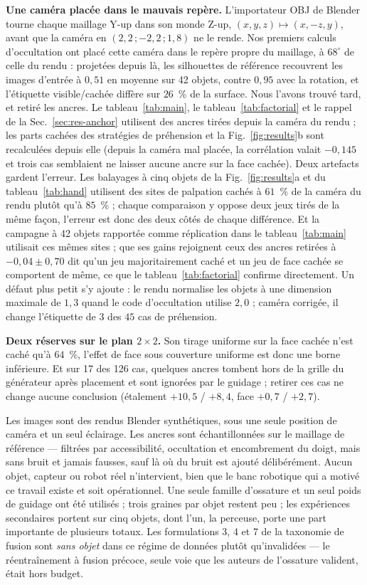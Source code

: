 \documentclass[conference]{IEEEtran}
\begin{document}
\textbf{Une caméra placée dans le mauvais repère.} L'importateur OBJ de Blender tourne
chaque maillage Y-up dans son monde Z-up, $(x, y, z) \mapsto (x, -z, y)$, avant que la
caméra en $(2{,}2\,; -2{,}2\,; 1{,}8)$ ne le rende. Nos premiers calculs d'occultation
ont placé cette caméra dans le repère propre du maillage, à $68^\circ$ de celle du
rendu : projetées depuis là, les silhouettes de référence recouvrent les images
d'entrée à $0{,}51$ en moyenne sur 42 objets, contre $0{,}95$ avec la rotation, et
l'étiquette visible/cachée diffère sur $26$~\% de la surface. Nous l'avons trouvé tard,
et retiré les ancres. Le tableau~\ref{tab:main}, le tableau~\ref{tab:factorial} et le
rappel de la Sec.~\ref{sec:res-anchor} utilisent des ancres tirées depuis la caméra du
rendu ; les parts cachées des stratégies de préhension et la Fig.~\ref{fig:results}b
sont recalculées depuis elle (depuis la caméra mal placée, la corrélation valait
$-0{,}145$ et trois cas semblaient ne laisser aucune ancre sur la face cachée). Deux
artefacts gardent l'erreur. Les balayages à cinq objets de la Fig.~\ref{fig:results}a
et du tableau~\ref{tab:hand} utilisent des sites de palpation cachés à $61$~\% de la
caméra du rendu plutôt qu'à $85$~\% ; chaque comparaison y oppose deux jeux tirés de la
même façon, l'erreur est donc des deux côtés de chaque différence. Et la campagne à 42
objets rapportée comme réplication dans le tableau~\ref{tab:main} utilisait ces mêmes
sites ; que ses gains rejoignent ceux des ancres retirées à $-0{,}04 \pm 0{,}70$ dit
qu'un jeu majoritairement caché et un jeu de face cachée se comportent de même, ce que
le tableau~\ref{tab:factorial} confirme directement. Un défaut plus petit s'y ajoute :
le rendu normalise les objets à une dimension maximale de $1{,}3$ quand le code
d'occultation utilise $2{,}0$ ; caméra corrigée, il change l'étiquette de $3$ des $45$
cas de préhension.

\textbf{Deux réserves sur le plan $2\times2$.} Son tirage uniforme sur la face cachée
n'est caché qu'à $64$~\%, l'effet de face sous couverture uniforme est donc une borne
inférieure. Et sur 17 des 126 cas, quelques ancres tombent hors de la grille du
générateur après placement et sont ignorées par le guidage ; retirer ces cas ne change
aucune conclusion (étalement $+10{,}5$ / $+8{,}4$, face $+0{,}7$ / $+2{,}7$).

Les images sont des rendus Blender synthétiques, sous une seule position de caméra et
un seul éclairage. Les ancres sont échantillonnées sur le maillage de référence ---
filtrées par accessibilité, occultation et encombrement du doigt, mais sans bruit et
jamais fausses, sauf là où du bruit est ajouté délibérément. Aucun objet, capteur ou
robot réel n'intervient, bien que le banc robotique qui a motivé ce travail existe et
soit opérationnel. Une seule famille d'ossature et un seul poids de guidage ont été
utilisés ; trois graines par objet restent peu ; les expériences secondaires portent
sur cinq objets, dont l'un, la perceuse, porte une part importante de plusieurs
totaux. Les formulations 3, 4 et 7 de la taxonomie de fusion sont \emph{sans objet}
dans ce régime de données plutôt qu'invalidées --- le réentraînement à fusion précoce,
seule voie que les auteurs de l'ossature valident, était hors budget.
\end{document}

